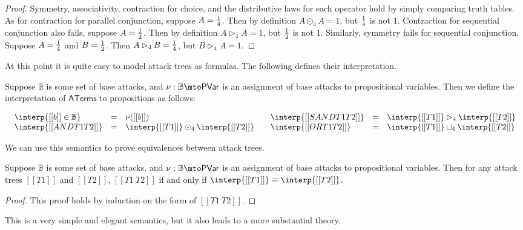 \begin{proof}
  Symmetry, associativity, contraction for choice, and the
  distributive laws for each operator hold by simply comparing truth
  tables.  As for contraction for parallel conjunction, suppose $A =
  \frac{1}{4}$.  Then by definition $A \odot_4 A = 1$, but $\frac{1}{4}$ is not
  $1$.  Contraction for sequential conjunction also fails, suppose $A
  = \frac{1}{2}$.  Then by definition $A \rhd_4 A = 1$, but $\frac{1}{2}$ is not
  $1$.  Similarly, symmetry fails for sequential conjunction. Suppose
  $A = \frac{1}{4}$ and $B = \frac{1}{2}$.  Then $A \rhd_4 B = \frac{1}{4}$, but $B
  \rhd_4 A = 1$.
\end{proof}

At this point it is quite easy to model attack trees as formulas.  The
following defines their interpretation.
\begin{definition}
  \label{def:interp-aterms-ternary}
  Suppose $\mathbb{B}$ is some set of base attacks, and $\nu :
  \mathbb{B} \mto \mathsf{PVar}$ is an assignment of base attacks to
  propositional variables.  Then we define the interpretation of
  $\mathsf{ATerms}$ to propositions as follows:
  \begin{center}
    \begin{math}
      \setlength{\arraycolsep}{5px}
      \begin{array}{lll}
        \begin{array}{lll}
          \interp{[[b]] \in \mathbb{B}} & = & \nu([[b]])\\
          \interp{[[AND T1 T2]]} & = & \interp{[[T1]]} \odot_4 \interp{[[T2]]}\\
        \end{array}
        &
        \begin{array}{lll}
          \interp{[[SAND T1 T2]]} & = & \interp{[[T1]]} \rhd_4 \interp{[[T2]]}\\
          \interp{[[OR T1 T2]]} & = & \interp{[[T1]]} \sqcup_4 \interp{[[T2]]}\\
        \end{array}
      \end{array}
    \end{math}
  \end{center}
\end{definition}
We can use this semantics to prove equivalences between attack trees.
\begin{lemma}
  \label{lemma:equivalence_of_attack_trees}
  Suppose $\mathbb{B}$ is some set of base attacks, and $\nu :
  \mathbb{B} \mto \mathsf{PVar}$ is an assignment of base attacks to
  propositional variables.  Then for any attack trees $[[T1]]$ and
  $[[T2]]$, $[[T1 ~ T2]]$ if and only if $\interp{[[T1]]} \equiv \interp{[[T2]]}$.
\end{lemma}
\begin{proof}
  This proof holds by induction on the form of $[[T1 ~ T2]]$.
\end{proof}
This is a very simple and elegant semantics, but it also leads to a
more substantial theory.

